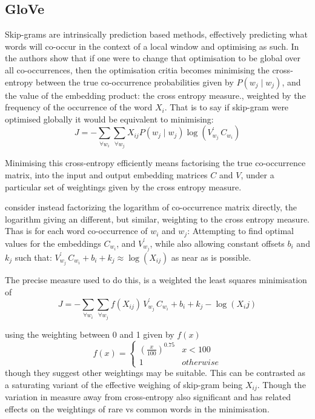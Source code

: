 \documentclass[parskip]{komatufte}
\begin{document}
\subsection{GloVe}

Skip-grams are intrinsically prediction based methods, effectively predicting what words will co-occur in the context of a local window and optimising as such.
In the authors show that if one were to change that optimisation to be global over all co-occurrences,
then the optimisation critia becomes minimising the cross-entropy between the true co-occurrence probabilities given by $P(w_j\mid w_j)$, and the value of the embedding product: the cross entropy measure.,
weighted by the frequency of the occurrence of the word $X_i$.
That is to say if skip-gram were optimised globally it would be equivalent to minimising:
\begin{equation}
J = - \sum_{\forall w_i} \sum_{\forall w_j} X_{ij} P(w_j\mid w_j) \log (V_{w_j}^\prime\,C_{w_{i}})
\end{equation}

Minimising this cross-entropy efficiently means factorising the true co-occurrence matrix,
into the input and output embedding matrices $C$ and $V$, under a particular set of weightings given by the cross entropy measure.

 consider instead factorizing the logarithm of co-occurrence matrix directly,
the logarithm giving an different, but similar, weighting to the cross entropy measure.
Thas is for each word co-occurrence of $w_i$ and $w_j$: Attempting to find optimal values for 
the embeddings $C_{w_{i}}$, and $V_{w_j}^\prime$, while also allowing constant offsets $b_i$ and $k_j$
such that:
$V_{w_j}^\prime\,C_{w_{i}} + b_i + k_j \approx \log(X_{ij})$
as near as is possible.


The precise measure used to do this, is a weighted the least squares minimisation of 
\begin{equation}
J = - \sum_{\forall w_i}  \sum_{\forall w_j} f(X_{ij})\,V_{w_j}^\prime\,C_{w_{i}}+b_i+k_j-\log (X_ij)
\end{equation}


using the weighting between 0 and 1 given by $f(x)$
\begin{equation}
f(x)=\begin{cases}
\left(\frac{x}{100}\right)^{0.75} & x<100\\
1 & otherwise
\end{cases}
\end{equation}
though they suggest other weightings may be suitable.
This can be contrasted as a saturating variant of the effective weighing of skip-gram being $X_{ij}$.
Though the variation in measure away from cross-entropy also significant and has related effects on the weightings of rare vs common words in the minimisation.
\end{document}
